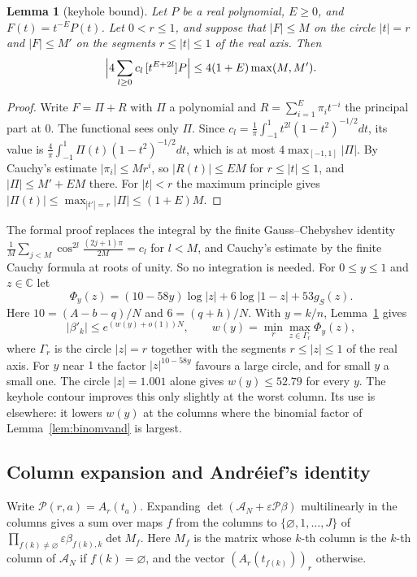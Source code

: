 \documentclass[11pt]{amsart}
\newtheorem{lemma}[theorem]{Lemma}
\theoremstyle{definition}
\theoremstyle{remark}
\numberwithin{equation}{section}
\newcommand{\C}{\mathbb C}
\newcommand{\cA}{\mathcal A}
\begin{document}
\begin{lemma}[keyhole bound]\label{lem:keyhole}
Let $P$ be a real polynomial, $E\ge0$, and $F(t)=t^{-E}P(t)$. Let $0<r\le1$, and suppose that $|F|\le M$ on
the circle $|t|=r$ and $|F|\le M'$ on the segments $r\le|t|\le1$ of the real axis. Then
\[
 \Bigl|4\sum_{l\ge0}c_l\,[t^{E+2l}]P\Bigr|\le4(1+E)\max(M,M').
\]
\end{lemma}

\begin{proof}
Write $F=\Pi+R$ with $\Pi$ a polynomial and $R=\sum_{i=1}^E\pi_it^{-i}$ the principal part at $0$. The
functional sees only $\Pi$. Since $c_l=\frac1\pi\int_{-1}^1t^{2l}(1-t^2)^{-1/2}dt$, its value is
$\frac4\pi\int_{-1}^1\Pi(t)(1-t^2)^{-1/2}dt$, which is at most $4\max_{[-1,1]}|\Pi|$. By Cauchy's estimate
$|\pi_i|\le Mr^i$, so $|R(t)|\le EM$ for $r\le|t|\le1$, and $|\Pi|\le M'+EM$ there. For $|t|<r$ the maximum
principle gives $|\Pi(t)|\le\max_{|t'|=r}|\Pi|\le(1+E)M$.
\end{proof}

The formal proof replaces the integral by the finite Gauss--Chebyshev identity
$\frac1M\sum_{j<M}\cos^{2l}\frac{(2j+1)\pi}{2M}=c_l$ for $l<M$, and Cauchy's estimate by the finite Cauchy formula
at roots of unity. So no integration is needed. For $0\le y\le1$ and $z\in\C$ let
\[
 \Phi_y(z)=(10-58y)\log|z|+6\log|1-z|+53g_S(z).
\]
Here $10=(A-b-q)/N$ and $6=(q+h)/N$. With $y=k/n$, Lemma~\ref{lem:keyhole} gives
\begin{equation}\label{eq:wk}
 |\beta'_k|\le e^{(w(y)+o(1))N},\qquad w(y)=\min_r\max_{z\in\Gamma_r}\Phi_y(z),
\end{equation}
where $\Gamma_r$ is the circle $|z|=r$ together with the segments $r\le|z|\le1$ of the real axis. For $y$ near
$1$ the factor $|z|^{10-58y}$ favours a large circle, and for small $y$ a small one. The circle $|z|=1.001$ alone
gives $w(y)\le52.79$ for every $y$. The keyhole contour improves this only slightly at the worst column. Its
use is elsewhere: it lowers $w(y)$ at the columns where the binomial factor of Lemma~\ref{lem:binomvand} is
largest.

\subsection{Column expansion and Andr\'eief's identity}\label{ssec:andreief}
Write $\mathcal P(r,a)=A_r(t_a)$. Expanding $\det(\cA_N+\varepsilon\mathcal P\beta)$ multilinearly in the
columns gives a sum over maps $f$ from the columns to $\{\varnothing,1,\ldots,J\}$ of
$\prod_{f(k)\ne\varnothing}\varepsilon\beta_{f(k),k}\det M_f$. Here $M_f$ is the matrix whose $k$-th column is
the $k$-th column of $\cA_N$ if $f(k)=\varnothing$, and the vector $(A_r(t_{f(k)}))_r$ otherwise.
\end{document}
